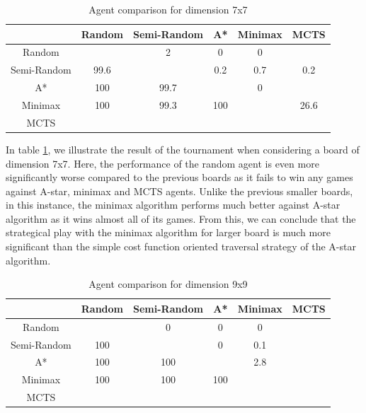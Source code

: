\begin{table}[!ht]
    \centering
     \begin{tabular}{|c|c|c|c|c|c|}\hline
                & Random & Semi-Random & A*  & Minimax & MCTS \\ \hline 
    Random      &        &    2        &  0  &   0     &      \\ \hline
    Semi-Random &   99.6 &             & 0.2 &  0.7    &  0.2 \\ \hline
    A*          &   100  &    99.7     &     &   0     &      \\ \hline
    Minimax     &   100  &    99.3     & 100 &         & 26.6 \\ \hline
    MCTS        &        &             &     &         &      \\ \hline
     \end{tabular}
     \caption{Agent comparison for dimension 7x7}
     \label{tab:agent_eval_7x7}
 \end{table}
 
In table \ref{tab:agent_eval_7x7}, we illustrate the result of the tournament when considering a board of dimension 7x7. Here, the performance of the random agent is even more significantly worse compared to the previous boards as it fails to win any games against A-star, minimax and MCTS agents. Unlike the previous smaller boards, in this instance, the minimax algorithm performs much better against A-star algorithm as it wins almost all of its games. From this, we can conclude that the strategical play with the minimax algorithm for larger board is much more significant than the simple cost function oriented traversal strategy of the A-star algorithm.
 

\begin{table}[!ht]
    \centering
     \begin{tabular}{|c|c|c|c|c|c|}\hline
                & Random & Semi-Random & A*  & Minimax & MCTS \\ \hline 
    Random      &        &    0        &  0  &   0     &      \\ \hline
    Semi-Random &   100  &             &  0  &  0.1    &      \\ \hline
    A*          &   100  &    100      &     &  2.8    &      \\ \hline
    Minimax     &   100  &    100      & 100 &         &      \\ \hline
    MCTS        &        &             &     &         &      \\ \hline
     \end{tabular}
     \caption{Agent comparison for dimension 9x9}
     \label{tab:agent_eval_9x9}
 \end{table}

